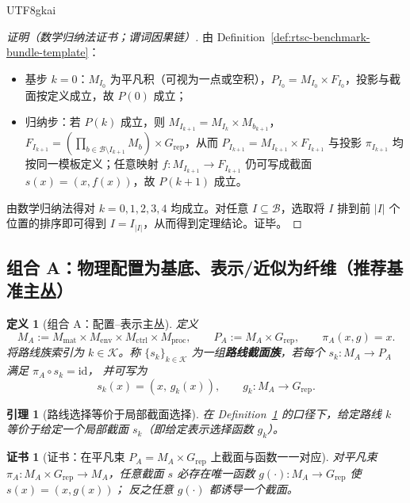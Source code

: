 \documentclass[12pt]{article}
\newtheorem{definition}{定义}[section]
\newtheorem{lemma}{引理}[section]
\newtheorem{certificate}{证书}[section]
\begin{document}
\begin{CJK*}{UTF8}{gkai}
\begin{proof}[证明（数学归纳法证书；谓词因果链）]
由 Definition~\ref{def:rtsc-benchmark-bundle-template}：
\begin{itemize}
  \item 基步 $k=0$：$M_{I_0}$ 为平凡积（可视为一点或空积），$P_{I_0}=M_{I_0}\times F_{I_0}$，投影与截面按定义成立，故 $P(0)$ 成立；
  \item 归纳步：若 $P(k)$ 成立，则 $M_{I_{k+1}}=M_{I_k}\times M_{b_{k+1}}$，$F_{I_{k+1}}=(\prod_{b\in\mathcal{B}\setminus I_{k+1}}
    M_b)\times G_{\mathrm{rep}}$，从而 $P_{I_{k+1}}=M_{I_{k+1}}\times F_{I_{k+1}}$ 与投影 $\pi_{I_{k+1}}$ 均按同一模板定义；任意映射 $f:
    M_{I_{k+1}}\to F_{I_{k+1}}$ 仍可写成截面 $s(x)=(x,f(x))$，故 $P(k+1)$ 成立。
\end{itemize}
由数学归纳法得对 $k=0,1,2,3,4$ 均成立。对任意 $I\subseteq\mathcal{B}$，选取将 $I$ 排到前 $|I|$ 个位置的排序即可得到 $I=I_{|I|}$，从而得到定理结论。证毕。
\end{proof}

\subsection{组合 A：物理配置为基底、表示/近似为纤维（推荐基准主丛）}

\begin{definition}[组合 A：配置--表示主丛]
\label{def:rtsc-bundle-A}
定义
\[
M_A:=M_{\mathrm{mat}}\times M_{\mathrm{env}}\times M_{\mathrm{ctrl}}\times M_{\mathrm{proc}},
\qquad
P_A:=M_A\times G_{\mathrm{rep}},
\qquad
\pi_A(x,g)=x.
\]
将路线族索引为 $k\in\mathcal{K}$。称 $\{s_k\}_{k\in\mathcal{K}}$ 为一组\textbf{路线截面族}，若每个 $s_k:M_A\to P_A$ 满足 $\pi_A\circ
  s_k=\mathrm{id}$，
并可写为
\[
s_k(x)=(x,\,g_k(x)),
\qquad g_k:M_A\to G_{\mathrm{rep}}.
\]
\end{definition}

\begin{lemma}[路线选择等价于局部截面选择]
\label{lem:route-as-section}
在 Definition~\ref{def:rtsc-bundle-A} 的口径下，给定路线 $k$ 等价于给定一个局部截面 $s_k$（即给定表示选择函数 $g_k$）。
\end{lemma}

\begin{certificate}[证书：在平凡束 $P_A=M_A\times G_{\mathrm{rep}}$ 上截面与函数一一对应]
\label{cert:section-function-bijection}
对平凡束 $\pi_A:M_A\times G_{\mathrm{rep}}\to M_A$，任意截面 $s$ 必存在唯一函数 $g(\cdot):M_A\to G_{\mathrm{rep}}$ 使 $s(x)=(x,g(x))$；
  反之任意 $g(\cdot)$ 都诱导一个截面。
\end{certificate}


\end{CJK*}
\end{document}
